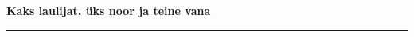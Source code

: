 \documentclass[10pt]{book}
\begin{document}
{
  \samepage
  \raggedbottom
  \raggedright
  \sloppy


  \vspace{0.2in}

  \noindent\begin{minipage}{.1\textwidth}
    \hfill\vspace{0.1in}
  \end{minipage}%
  \noindent\begin{minipage}{.8\textwidth}
    \centering
    \bfseries
    \large Kaks laulijat, \"uks noor ja teine vana
  \end{minipage}%
  \noindent\begin{minipage}{.1\textwidth}
      \hfill\vspace{0.1in}
  \end{minipage}

  \nopagebreak[4]
  \vspace{0.1in}
  \nopagebreak[4]
  \hrule height 0.05ex
  \nopagebreak[4]
  \vspace{-0.05in}




}
\end{document}
